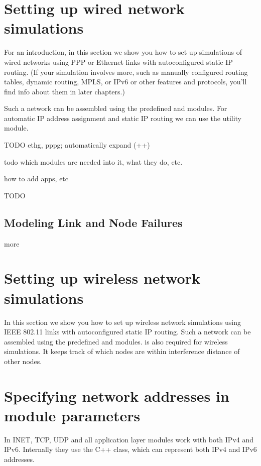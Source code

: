 \section{Setting up wired network simulations}

For an introduction, in this section we show you how to set up simulations
of wired networks using PPP or Ethernet links with autoconfigured static IP
routing. (If your simulation involves more, such as manually configured
routing tables, dynamic routing, MPLS, or IPv6 or other features and protocols,
you'll find info about them in later chapters.)

Such a network can be assembled using the predefined 
and  modules. For automatic IP address assignment and
static IP routing we can use the  utility
module.

\ifdraft TODO
ethg, pppg;  automatically expand (++)

todo which modules are needed into it, what they do, etc.

how to add apps, etc
\fi

\ifdraft TODO
\subsection{Modeling Link and Node Failures}

more
\fi


\section{Setting up wireless network simulations}

In this section we show you how to set up wireless network simulations using
IEEE 802.11 links with autoconfigured static IP routing. Such a network can be
assembled using the predefined  and 
modules.  is also required for wireless simulations. It
keeps track of which nodes are within interference distance of other nodes.


\section{Specifying network addresses in module parameters}

In INET, TCP, UDP and all application layer modules work with
both IPv4 and IPv6. Internally they use the  C++ class, which
can represent both IPv4 and IPv6 addresses.

